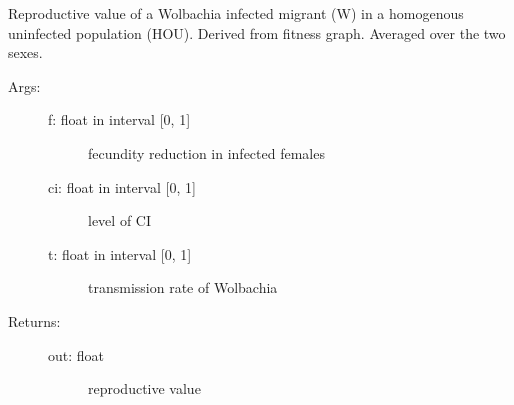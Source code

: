 \documentclass[letterpaper,10pt,english]{sphinxmanual}
\begin{document}
\begin{fulllineitems}
\label{index:wspec.analytical.reproval_WHOMU}
Reproductive value of a Wolbachia infected migrant (W) in a 
homogenous uninfected population (HOU). Derived from fitness graph.
Averaged over the two sexes.
\begin{description}
\item[{Args:}] \leavevmode\begin{description}
\item[{f: float in interval {[}0, 1{]}}] \leavevmode
fecundity reduction in infected females

\item[{ci: float in interval {[}0, 1{]}}] \leavevmode
level of CI

\item[{t: float in interval {[}0, 1{]}}] \leavevmode
transmission rate of Wolbachia

\end{description}

\item[{Returns:}] \leavevmode\begin{description}
\item[{out: float}] \leavevmode
reproductive value

\end{description}

\end{description}

\end{fulllineitems}

\end{document}
